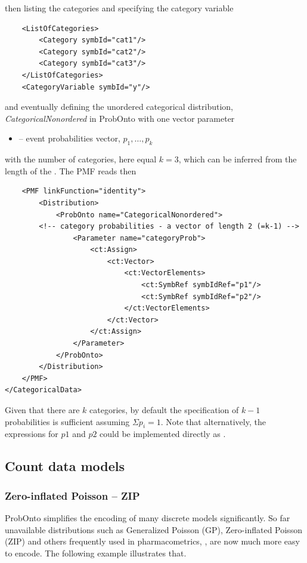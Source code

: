 then listing the categories and specifying the category variable
\lstset{language=XML}
\begin{lstlisting}
    <ListOfCategories> 
        <Category symbId="cat1"/>
        <Category symbId="cat2"/>
        <Category symbId="cat3"/>
    </ListOfCategories>                    
    <CategoryVariable symbId="y"/>
\end{lstlisting}
and eventually defining the unordered categorical distribution, \emph{CategoricalNonordered} 
in ProbOnto with one vector parameter
\begin{itemize}
\item 
{}  -- event probabilities vector, $p_1, \ldots, p_k$
\end{itemize}
with the number of categories, here equal $k\!=\!3$, which can be inferred from the length of the 
. The PMF reads then

\lstset{language=XML}
\begin{lstlisting}
    <PMF linkFunction="identity">
        <Distribution>
            <ProbOnto name="CategoricalNonordered">
		<!-- category probabilities - a vector of length 2 (=k-1) -->
                <Parameter name="categoryProb">
                    <ct:Assign>
                        <ct:Vector>
                            <ct:VectorElements>
                                <ct:SymbRef symbIdRef="p1"/>
                                <ct:SymbRef symbIdRef="p2"/>
                            </ct:VectorElements>
                        </ct:Vector>
                    </ct:Assign>
                </Parameter>
            </ProbOnto>
        </Distribution>
    </PMF>
</CategoricalData>
\end{lstlisting}
Given that there are $k$ categories, by default the specification of $k-1$ probabilities 
is sufficient assuming $\Sigma p_i = 1$. Note that alternatively, the expressions for 
$p1$ and $p2$ could be implemented directly as .

\subsection{Count data models}

\subsubsection{Zero-inflated Poisson -- ZIP}
ProbOnto simplifies the encoding of many discrete models significantly. 
So far unavailable distributions such as Generalized Poisson (GP), 
Zero-inflated Poisson (ZIP) and others frequently used in pharmacometrics,
\cite{Plan:2009fk, Troconiz:2009fv}, are now much more easy to encode. The following example illustrates that.

